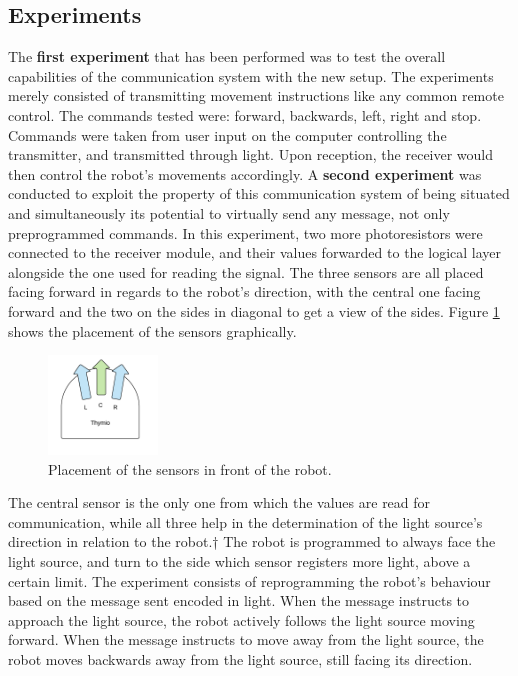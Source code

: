 \subsection{Experiments}
The \textbf{first experiment} that has been performed was to test the overall capabilities of the communication system with the new setup.
The experiments merely consisted of transmitting movement instructions like any common remote control.
The commands tested were: forward, backwards, left, right and stop.
Commands were taken from user input on the computer controlling the transmitter, and transmitted through light.
Upon reception, the receiver would then control the robot's movements accordingly.
\newline
A \textbf{second experiment} was conducted to exploit the property of this communication system of being situated and simultaneously its potential to virtually send any message, not only preprogrammed commands.
In this experiment, two more photoresistors were connected to the receiver module, and their values forwarded to the logical layer alongside the one used for reading the signal.
The three sensors are all placed facing forward in regards to the robot's direction, with the central one facing forward and the two on the sides in diagonal to get a view of the sides.
Figure \ref{fig:thymioangles} shows the placement of the sensors graphically.
%
\begin{figure}[hbt]
\centering
  \includegraphics[height=100px]{img/thymioangles}
  \caption{Placement of the sensors in front of the robot.}
  \label{fig:thymioangles}
\end{figure}
%
The central sensor is the only one from which the values are read for communication, while all three help in the determination of the light source's direction in relation to the robot.†
The robot is programmed to always face the light source, and turn to the side which sensor registers more light, above a certain limit.
The experiment consists of reprogramming the robot's behaviour based on the message sent encoded in light.
When the message instructs to approach the light source, the robot actively follows the light source moving forward.
When the message instructs to move away from the light source, the robot moves backwards away from the light source, still facing its direction.
